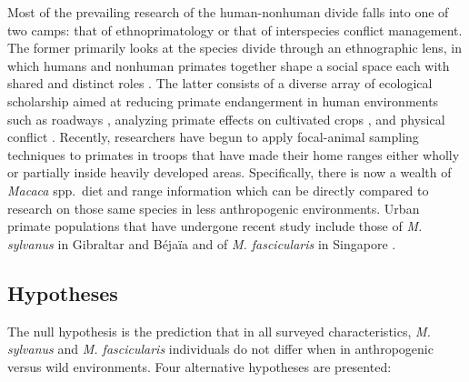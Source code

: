 \documentclass{../../../coursework}
\begin{document}
Most of the prevailing research of the human-nonhuman divide falls into one of
two camps: that of ethnoprimatology or that of interspecies conflict
management. The former primarily looks at the species divide through an
ethnographic lens, in which humans and nonhuman primates together shape a
social space each with shared and distinct roles \parencite{Fue12,Ril13}. The
latter consists of a diverse array of ecological scholarship aimed at reducing
primate endangerment in human environments such as roadways \parencite{Lin16},
analyzing primate effects on cultivated crops \parencite{Hil17,Hoc17,McK15},
and physical conflict \parencite{Hof12}. Recently, researchers have begun to
apply focal-animal sampling techniques to primates in troops that have made
their home ranges either wholly or partially inside heavily developed areas.
Specifically, there is now a wealth of
\textit{Macaca} spp.\ diet and range information
which can be directly compared to research on those same species in less
anthropogenic environments. Urban primate populations that have undergone
recent study include those of \textit{M. sylvanus} in Gibraltar
\parencite{Ethnoprimatology6,Kle17} and Béjaïa \parencite{Mai15} and of
\textit{M. fascicularis} in Singapore \parencite{Kle17}.

\subsection{Hypotheses}

The null hypothesis is the prediction that in all surveyed characteristics,
\textit{M. sylvanus} and \textit{M. fascicularis} individuals do not differ
when in anthropogenic versus wild environments. Four alternative hypotheses
are presented:
\end{document}
